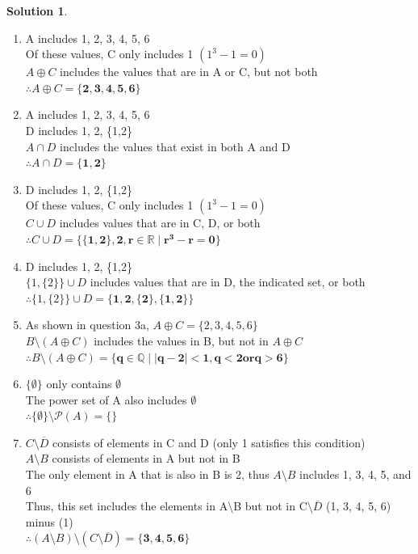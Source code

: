 \documentclass{article}
\theoremstyle{definition}
\newtheorem*{solution}{Solution}
\begin{document}
\begin{solution}
\end{solution}
\begin{enumerate}[label = \alph*)] 
    \item 
    A includes 1, 2, 3, 4, 5, 6\\
    Of these values, C only includes 1 $(1^3-1=0)$\\
    $A\oplus C$ includes the values that are in A or C, but not both\\
    $\therefore A\oplus C = \mathbf{\{2, 3, 4, 5, 6\}}$
    
    \item
    A includes 1, 2, 3, 4, 5, 6\\
    D includes 1, 2, \{1,2\}\\
    $A\cap D$ includes the values that exist in both A and D\\
    $\therefore A\cap D = \mathbf{\{1, 2\}}$
    
    \item
    D includes 1, 2, \{1,2\}\\
    Of these values, C only includes 1 $(1^3-1=0)$\\
    $C\cup D$ includes values that are in C, D, or both\\
    $\therefore C\cup D = \mathbf{\{\{1,2\}, 2, r \in \mathbb{R} \mid r^3 - r = 0\}} $
    
    \item
    D includes 1, 2, \{1,2\} \\
    $\{1, \{2\}\} \cup D$ includes values that are in D, the indicated set, or both\\
    $\therefore \{1, \{2\}\} \cup D = \mathbf{\{1, 2, \{2\}, \{1, 2\}\}}$
    
    \item
    As shown in question 3a, $A\oplus C = \{2, 3, 4, 5, 6\}$\\
    $B \setminus (A \oplus C)$ includes the values in B, but not in $A\oplus C$\\
    $\therefore B\setminus (A\oplus C) = \mathbf{\{q \in \mathbb{Q} \mid \mid q-2\mid <1, q<2 or q>6\}}$
    
    \item
    $\{\emptyset\}$ only contains $\emptyset$\\
    The power set of A also includes $\emptyset$\\
    $\therefore \{\emptyset\}\setminus\mathcal{P}(A) = \{\}$
    
    \item
    $C\setminus \overline{D}$ consists of elements in C and D (only 1 satisfies this condition)\\
    $A\setminus B$ consists of elements in A but not in B\\
    The only element in A that is also in B is 2, thus $A\setminus B$ includes 1, 3, 4, 5, and 6\\
    Thus, this set includes the elements in A$\setminus$B but not in C$\setminus\overline{D}$ (1, 3, 4, 5, 6) minus (1)\\
    $\therefore (A\setminus B)\setminus (C\setminus \overline{D}) = \mathbf{\{3,4,5,6\}}$
    

\end{enumerate}
\end{document}
